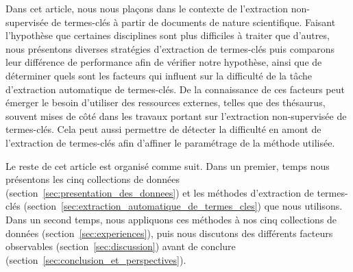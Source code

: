   Dans cet article, nous nous plaçons dans le contexte de l'extraction
  non-supervisée de termes-clés à partir de documents de nature scientifique.
  Faisant l'hypothèse que certaines disciplines sont plus difficiles à traiter
  que d'autres, nous présentons diverses stratégies d'extraction de termes-clés
  puis comparons leur différence de performance afin de vérifier notre
  hypothèse, ainsi que de déterminer quels sont les facteurs qui influent sur la
  difficulté de la tâche d'extraction automatique de termes-clés. De la
  connaissance de ces facteurs peut émerger le besoin d'utiliser des ressources
  externes, telles que des thésaurus, souvent mises de côté dans les travaux
  portant sur l'extraction non-supervisée de termes-clés. Cela peut aussi
  permettre de détecter la difficulté en amont de l'extraction de termes-clés
  afin d'affiner le paramétrage de la méthode utilisée.

  Le reste de cet article est organisé comme suit. Dans un premier, temps nous
  présentons les cinq collections de données
  (section~\ref{sec:presentation_des_donnees}) et les méthodes d'extraction de
  termes-clés (section~\ref{sec:extraction_automatique_de_termes_cles}) que nous
  utilisons. Dans un second temps, nous appliquons ces méthodes à nos cinq
  collections de données (section~\ref{sec:experiences}), puis nous discutons
  des différents facteurs observables (section~\ref{sec:discussion}) avant de
  conclure (section~\ref{sec:conclusion_et_perspectives}).

